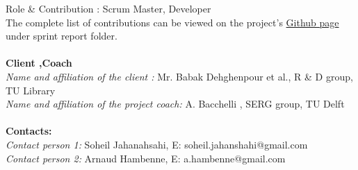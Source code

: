    Role \& Contribution : Scrum Master, Developer\\
 The complete list of contributions can be viewed on the project's \href{https://github.com/solix/Virtual.Assistant.TU.Library/tree/master/Documentation/Sprint%20Reports}{Github page} under sprint report folder.\\\\
\textbf{Client ,Coach \\}
\textit{Name and affiliation of the client : } Mr. Babak Dehghenpour et al., R \& D group, TU Library\\
\textit{Name and affiliation of the project coach:} A. Bacchelli , SERG group, TU Delft \\\\
\textbf{Contacts: \\}
\textit{Contact person 1: } Soheil Jahanahsahi, E: soheil.jahanshahi@gmail.com \\
\textit{Contact person 2: } Arnaud Hambenne, E: a.hambenne@gmail.com 


